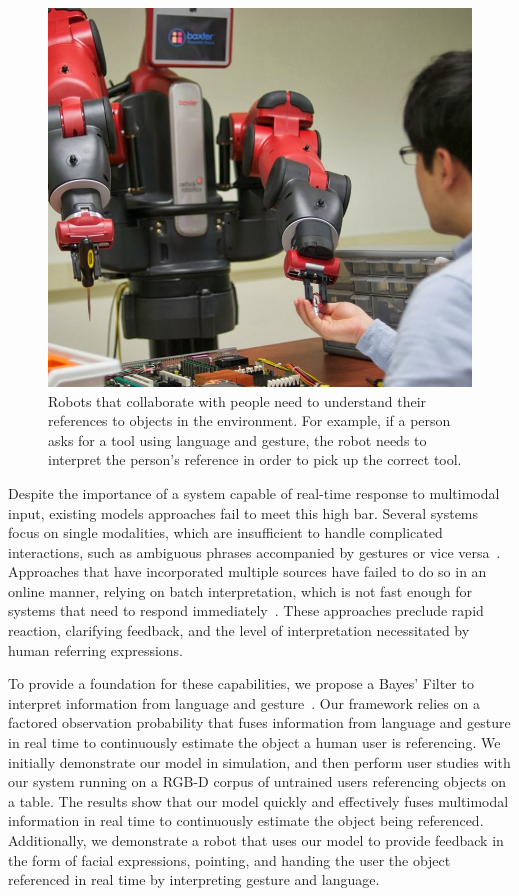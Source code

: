 \documentclass[a4paper, 11pt]{article} %
\begin{document}
\begin{figure}[h]
\centering
\includegraphics[width=0.3\linewidth]{images/baxter_scene_cropped.jpg}
\caption{Robots that collaborate with people need to understand their
  references to objects in the environment.  For example, if a person
  asks for a tool using language and gesture, the robot needs to
  interpret the person's reference in order to pick up the correct
  tool.\label{fig:example}}
\end{figure}

Despite the importance of a system capable of real-time response to multimodal input, existing models approaches fail to meet this high bar. Several systems focus on single modalities, which are insufficient to handle complicated interactions, such as ambiguous phrases accompanied by gestures or vice versa~\citep{tellex11, kollar10}. Approaches that have incorporated multiple sources have failed to do so in an online manner, relying on batch interpretation, which is not fast enough for systems that need to respond immediately~\citep{matuszek14}. These approaches preclude rapid reaction, clarifying feedback, and the level of interpretation necessitated by human referring expressions.

To provide a foundation for these capabilities, we propose a Bayes' Filter to interpret information from language and gesture~\citep{thrun08}. Our framework relies on a factored observation probability that fuses information from language and gesture in real time to continuously estimate the object a human user is referencing. We initially demonstrate our model in simulation, and then perform user studies with our system running on a RGB-D corpus of untrained users referencing objects on a table. The results show that our model quickly and effectively fuses multimodal information in real time to continuously estimate the object being referenced. Additionally, we demonstrate a robot that uses our model to provide feedback in the form of facial expressions, pointing, and handing the user the object referenced in real time by interpreting gesture and language.
\end{document}
